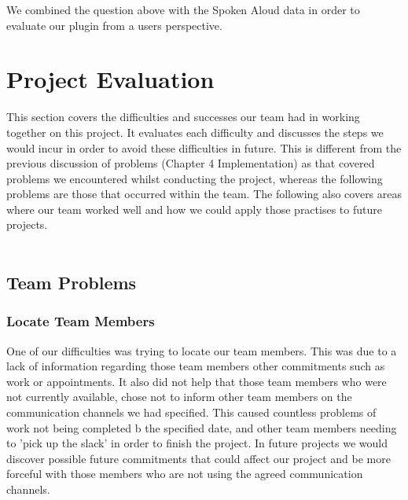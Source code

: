 We combined the question above with the Spoken Aloud data in order to evaluate our plugin from a users perspective.
\\
\section{Project Evaluation}
This section covers the difficulties and successes our team had in working together on this project. It evaluates each difficulty and discusses the steps we would incur in order to avoid these difficulties in future. This is different from the previous discussion of problems (Chapter 4 Implementation) as that covered problems we encountered whilst conducting the project, whereas the following problems are those that occurred within the team. The following also covers areas where our team worked well and how we could apply those practises to future projects.  \\
\\
\subsection{Team Problems}

\subsubsection{Locate Team Members}
One of our difficulties was trying to locate our team members. This was due to a lack of information regarding those team members other commitments such as work or appointments. It also did not help that those team members who were not currently available, chose not to inform other team members on the communication channels we had specified. This caused countless problems of work not being completed b the specified date, and other team members needing to 'pick up the slack' in order to finish the project. In future projects we would discover possible future commitments that could affect our project and be more forceful with those members who are not using the agreed communication channels.\\
\\
